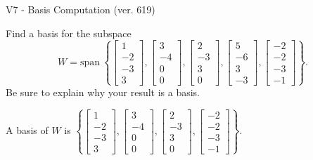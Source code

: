 \begin{exercise}
  \begin{exerciseTitle}V7 - Basis Computation (ver. 619)\end{exerciseTitle}
  \begin{exerciseStatement}
    Find a basis for the subspace 
\[W=\mathrm{span}\ \left\{\left[\begin{array}{r}
1 \\
-2 \\
-3 \\
3
\end{array}\right] , \left[\begin{array}{r}
3 \\
-4 \\
0 \\
0
\end{array}\right] , \left[\begin{array}{r}
2 \\
-3 \\
3 \\
0
\end{array}\right] , \left[\begin{array}{r}
5 \\
-6 \\
3 \\
-3
\end{array}\right] , \left[\begin{array}{r}
-2 \\
-2 \\
-3 \\
-1
\end{array}\right]\right\}.\]
 Be sure to explain why your result is a basis.


  \end{exerciseStatement}
  \begin{exerciseAnswer}
   A basis of \(W\) is  \(\left\{\left[\begin{array}{r}
1 \\
-2 \\
-3 \\
3
\end{array}\right] , \left[\begin{array}{r}
3 \\
-4 \\
0 \\
0
\end{array}\right] , \left[\begin{array}{r}
2 \\
-3 \\
3 \\
0
\end{array}\right] , \left[\begin{array}{r}
-2 \\
-2 \\
-3 \\
-1
\end{array}\right]\right\}\).
  


  \end{exerciseAnswer}
\end{exercise}